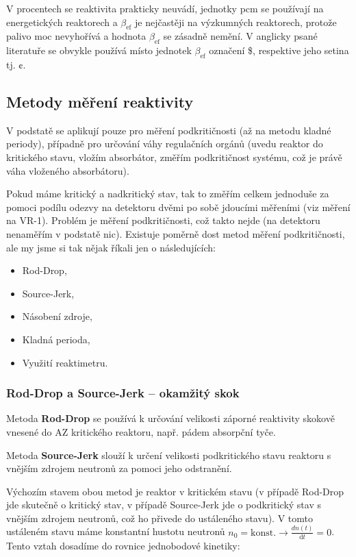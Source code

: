 V procentech se reaktivita prakticky neuvádí, jednotky pcm se používají na energetických reaktorech a $\beta_\text{ef}$ je nejčastěji na výzkumných reaktorech, protože palivo moc nevyhořívá a hodnota $\beta_\text{ef}$ se zásadně nemění. V anglicky psané literatuře se obvykle používá místo jednotek $\beta_{\text{ef}}$ označení \$, respektive jeho setina tj. ¢.

\subsection{Metody měření reaktivity}

V podstatě se aplikují pouze pro měření podkritičnosti (až na metodu kladné periody), případně pro určování váhy regulačních orgánů (uvedu reaktor do kritického stavu, vložím absorbátor, změřím podkritičnost systému, což je právě váha vloženého absorbátoru). 

Pokud máme kritický a nadkritický stav, tak to změřím celkem jednoduše za pomoci podílu odezvy na detektoru dvěmi po sobě jdoucími měřeními (viz měření na VR-1). Problém je měření podkritičnosti, což takto nejde (na detektoru nenaměřím v podstatě nic). Existuje poměrně dost metod měření podkritičnosti, ale my jsme si tak nějak říkali jen o následujících:

\begin{itemize}%
    \item Rod-Drop,
    \item Source-Jerk,
    \item Násobení zdroje,
    \item Kladná perioda,
    \item Využití reaktimetru.
\end{itemize}

\subsubsection{Rod-Drop a Source-Jerk -- okamžitý skok}

Metoda \textbf{Rod-Drop} se používá k určování velikosti záporné reaktivity skokově vnesené do AZ kritického reaktoru, např. pádem absorpční tyče. 

Metoda \textbf{Source-Jerk} slouží k určení velikosti podkritického stavu reaktoru s vnějším zdrojem neutronů za pomoci jeho odstranění.

Výchozím stavem obou metod je reaktor v kritickém stavu (v případě Rod-Drop jde skutečně o kritický stav, v případě Source-Jerk jde o podkritický stav s vnějším zdrojem neutronů, což ho přivede do ustáleného stavu). V tomto ustáleném stavu máme konstantní hustotu neutronů $n_0 = \text{konst.} \rightarrow \frac{dn(t)}{\text{d}t} = 0$. Tento vztah dosadíme do rovnice jednobodové kinetiky:


